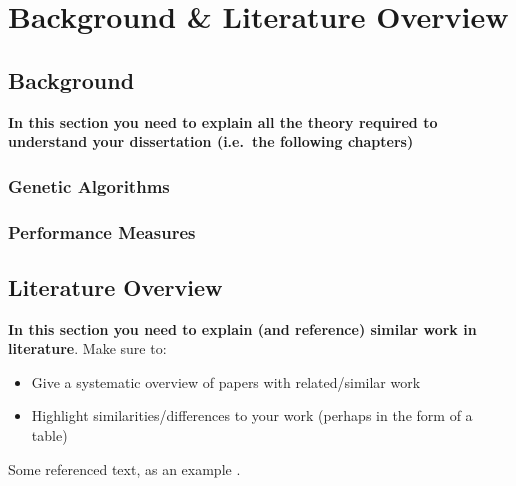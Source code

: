 \chapter{Background \& Literature Overview}
\blindtext
\section{Background}
\textbf{In this section you need to explain all the theory required to understand your dissertation (i.e.\ the following chapters)}
\subsection{Genetic Algorithms}
\blindtext
\subsection{Performance Measures}
\blindtext
\section{Literature Overview}
\textbf{In this section you need to explain (and reference) similar work in literature}.  Make sure to:

\begin{itemize}
 \item Give a systematic overview of papers with related/similar work
 \item Highlight similarities/differences to your work (perhaps in the form of a table)
\end{itemize}

Some referenced text, as an example \citep{WithersMartinez2012, Ebejer2016}.

